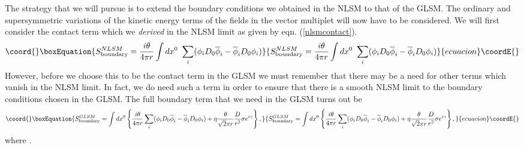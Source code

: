 \documentclass[a4paper,12pt]{article}
\begin{document}
The strategy that we will pursue is to extend the boundary conditions
we obtained in the NLSM to that of the GLSM. The ordinary and
supersymmetric variations of the kinetic energy terms of the fields in
the vector multiplet will now have to be considered. We will first
consider the contact term which we {\it derived} in the NLSM limit
as given by eqn. (\ref{nlsmcontact}).
\begin{equation}\coord{}\boxEquation{
S^{NLSM}_{\rm boundary}= {{i\theta}\over{4\pi r}} \int dx^0\ 
\sum_i (\phi_i D_0\overline{\phi}_i - \overline{\phi}_iD_0 \phi_i)
}{
S^{NLSM}_{\rm boundary}= {{i\theta}\over{4\pi r}} \int dx^0\ 
\sum_i (\phi_i D_0\overline{\phi}_i - \overline{\phi}_iD_0 \phi_i)
}{ecuacion}\coordE{}\end{equation}
However, before we choose this to be the contact term in the GLSM we
must remember that there may be a need for other terms which vanish in the
NLSM limit. In fact, we do need such a term in order to ensure that
there is a smooth NLSM limit to the boundary conditions chosen in
the GLSM. The full boundary term that  we need in the GLSM turns out be
\begin{equation}\coord{}\boxEquation{
S^{GLSM}_{\rm boundary}= \int dx^0\left\{ {{i\theta}\over{4\pi r}} 
\sum_i (\phi_i D_0\overline{\phi}_i - \overline{\phi}_iD_0 \phi_i)
+ \eta{{\theta}\over{\sqrt{2}\pi r}} {D\over{e^2}}\sigma e^{i\gamma}
\right\}\label{boundterm},
}{
S^{GLSM}_{\rm boundary}= \int dx^0\left\{ {{i\theta}\over{4\pi r}} 
\sum_i (\phi_i D_0\overline{\phi}_i - \overline{\phi}_iD_0 \phi_i)
+ \eta{{\theta}\over{\sqrt{2}\pi r}} {D\over{e^2}}\sigma e^{i\gamma}
\right\},
}{ecuacion}\coordE{}\end{equation}
where \coordHE{}.
\end{document}
